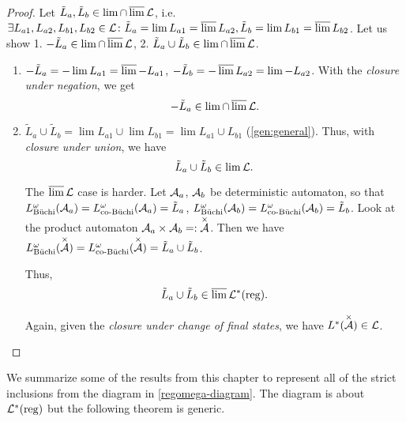 \begin{theorem}
\begin{proof}
Let $\tilde L_a,\tilde L_b \in \lim \cap \operatorname{\overline{lim}} \mathcal{L}$, i.e. $\exists L_{a1}, L_{a2}, L_{b1}, L_{b2} \in \mathcal{L} \colon \tilde L_a = \lim L_{a1} = \operatorname{\overline{lim}} L_{a2}, \tilde L_b = \lim L_{b1} = \operatorname{\overline{lim}} L_{b2}$. Let us show 1. $-\tilde L_a \in \lim \cap \operatorname{\overline{lim}} \mathcal{L}$, 2. $\tilde L_a \cup \tilde L_b \in \lim \cap \operatorname{\overline{lim}} \mathcal{L}$.
\begin{enumerate}
\item $-\tilde L_a = -\lim L_{a1} = \operatorname{\overline{lim}} -L_{a1}$, $-\tilde L_b = -\operatorname{\overline{lim}} L_{a2} = \lim -L_{a2}$. With the \emph{closure under negation}, we get
\[ -\tilde L_a \in \lim \cap \operatorname{\overline{lim}} \mathcal{L} . \]

\item
$\tilde L_a \cup \tilde L_b = \lim L_{a1} \cup \lim L_{b1} = \lim L_{a1} \cup L_{b1}$ (\ref{gen:general}). Thus, with \emph{closure under union}, we have
\[ \tilde L_a \cup \tilde L_b \in \lim \mathcal{L} . \]

The $\operatorname{\overline{lim}}\mathcal{L}$ case is harder.
Let $\mathcal{A}_a$, $\mathcal{A}_b$ be deterministic automaton, so that $L^\omega_{\text{Büchi}}(\mathcal{A}_a) = L^\omega_{\text{co-Büchi}}(\mathcal{A}_a) = \tilde L_a$, $L^\omega_{\text{Büchi}}(\mathcal{A}_b) = L^\omega_{\text{co-Büchi}}(\mathcal{A}_b) = \tilde L_b$. Look at the product automaton $\mathcal{A}_a \times \mathcal{A}_b =: \overset{\times}{\mathcal{A}}$. Then we have $L^\omega_{\text{Büchi}}(\overset{\times}{\mathcal{A}}) = L^\omega_{\text{co-Büchi}}(\overset{\times}{\mathcal{A}}) = \tilde L_a \cup \tilde L_b$.

Thus,
\[ \tilde L_a \cup \tilde L_b \in \operatorname{\overline{lim}} \mathcal{L}^*(\textup{\textrm{reg}}) . \]

Again, given the \emph{closure under change of final states}, we have $L^*(\overset{\times}{\mathcal{A}}) \in \mathcal{L}$.
\end{enumerate}
\end{proof}
\end{theorem}

We summarize some of the results from this chapter to represent all of the strict inclusions from the diagram in \cref{regomega-diagram}. The diagram is about $\mathcal{L}^*(\textup{\textrm{reg}})$ but the following theorem is generic.

